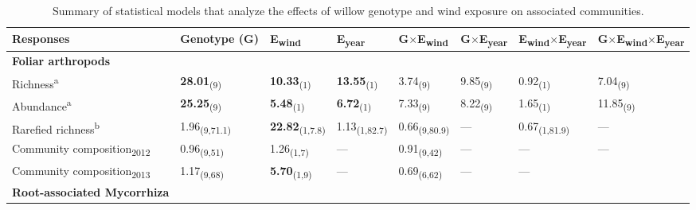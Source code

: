 \documentclass[11pt]{article}
\begin{document}
\begin{table}
\centering
\caption{Summary of statistical models that analyze the
effects of willow genotype and wind exposure on associated communities.}
\label{wComm}
\begin{tabular}{@{}llllllll@{}}
\toprule
Responses  & Genotype (G)  & E\textsubscript{wind}  & E\textsubscript{year}   & G$\times$E\textsubscript{wind}       & G$\times$E\textsubscript{year}       & E\textsubscript{wind}$\times$E\textsubscript{year}    & G$\times$E\textsubscript{wind}$\times$E\textsubscript{year} \\
\midrule
\textbf{Foliar arthropods}  \\
Richness\textsuperscript{a}                  & \textbf{28.01}\textsubscript{(9)}      & \textbf{10.33}\textsubscript{(1)}     & \textbf{13.55}\textsubscript{(1)}        & 3.74\textsubscript{(9)}       & 9.85\textsubscript{(9)}       & 0.92\textsubscript{(1)}        & 7.04\textsubscript{(9)}       \\
Abundance\textsuperscript{a}                 & \textbf{25.25}\textsubscript{(9)}      & \textbf{5.48}\textsubscript{(1)}      & \textbf{6.72}\textsubscript{(1)}         & 7.33\textsubscript{(9)}       & 8.22\textsubscript{(9)}       & 1.65\textsubscript{(1)}        & 11.85\textsubscript{(9)}      \\
Rarefied richness\textsuperscript{b}         & 1.96\textsubscript{(9,71.1)}  & \textbf{22.82}\textsubscript{(1,7.8)} & 1.13\textsubscript{(1,82.7)}    & 0.66\textsubscript{(9,80.9)}  & ---             & 0.67\textsubscript{(1,81.9)}   & ---             \\
Community composition\textsubscript{2012}  & 0.96\textsubscript{(9,51)}    & 1.26\textsubscript{(1,7)}    &       ---          & 0.91\textsubscript{(9,42)}    &   ---            &       ---         &       ---        \\
Community composition\textsubscript{2013}  & 1.17\textsubscript{(9,68)}    & \textbf{5.70}\textsubscript{(1,9)}    &     ---            & 0.69\textsubscript{(6,62)}    &      ---         &       ---         &               \\
\textbf{Root-associated Mycorrhiza} &               &              &                 &               &               &                &               \\

\end{tabular}
\end{table}
\end{document}
